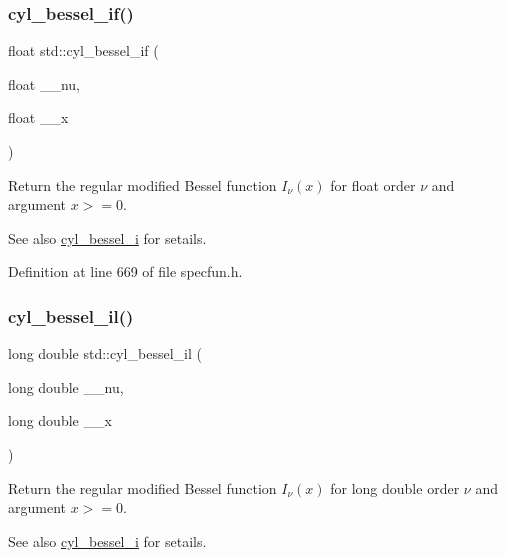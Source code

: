\subsubsection{\texorpdfstring{cyl\+\_\+bessel\+\_\+if()}{cyl\_bessel\_if()}}
{\footnotesize\ttfamily float std\+::cyl\+\_\+bessel\+\_\+if (\begin{DoxyParamCaption}\item[{float}]{\+\_\+\+\_\+nu,  }\item[{float}]{\+\_\+\+\_\+x }\end{DoxyParamCaption})\hspace{0.3cm}{\ttfamily [inline]}}

Return the regular modified Bessel function $ I_{\nu}(x) $ for {\ttfamily float} order $ \nu $ and argument $ x >= 0 $.

\begin{DoxySeeAlso}{See also}
\hyperlink{group__tr29124__math__spec__func_gac2ce366244694be909cd13bf8e1b439c}{cyl\+\_\+bessel\+\_\+i} for setails. 
\end{DoxySeeAlso}


Definition at line 669 of file specfun.\+h.

\mbox{\label{group__tr29124__math__spec__func_gab7962629216d03efb8ecaa3f70c6878f}} 
\subsubsection{\texorpdfstring{cyl\+\_\+bessel\+\_\+il()}{cyl\_bessel\_il()}}
{\footnotesize\ttfamily long double std\+::cyl\+\_\+bessel\+\_\+il (\begin{DoxyParamCaption}\item[{long double}]{\+\_\+\+\_\+nu,  }\item[{long double}]{\+\_\+\+\_\+x }\end{DoxyParamCaption})\hspace{0.3cm}{\ttfamily [inline]}}

Return the regular modified Bessel function $ I_{\nu}(x) $ for {\ttfamily long double} order $ \nu $ and argument $ x >= 0 $.

\begin{DoxySeeAlso}{See also}
\hyperlink{group__tr29124__math__spec__func_gac2ce366244694be909cd13bf8e1b439c}{cyl\+\_\+bessel\+\_\+i} for setails. 
\end{DoxySeeAlso}


